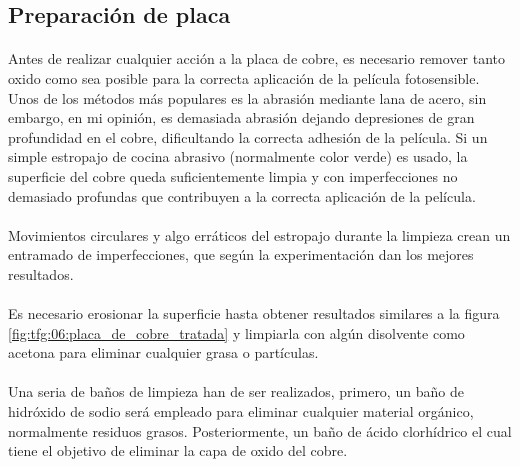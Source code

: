 \subsection{Preparación de placa}

\paragraph{} Antes de realizar cualquier acción a la placa de cobre, es necesario remover tanto oxido como sea posible para la correcta aplicación de la película fotosensible. Unos de los métodos más populares es la abrasión mediante lana de acero, sin embargo, en mi opinión, es demasiada abrasión dejando depresiones de gran profundidad en el cobre, dificultando la correcta adhesión de la película. Si un simple estropajo de cocina abrasivo (normalmente color verde) es usado, la superficie del cobre queda suficientemente limpia y con imperfecciones no demasiado profundas que contribuyen a la correcta aplicación de la película.

\paragraph{} Movimientos circulares y algo erráticos del estropajo durante la limpieza crean un entramado de imperfecciones, que según la experimentación dan los mejores resultados.

\paragraph{} Es necesario erosionar la superficie hasta obtener resultados similares a la figura \ref{fig:tfg:06:placa_de_cobre_tratada} y limpiarla con algún disolvente como acetona para eliminar cualquier grasa o partículas.

\paragraph{} Una seria de baños de limpieza han de ser realizados, primero, un baño de hidróxido de sodio será empleado para eliminar cualquier material orgánico, normalmente residuos grasos. Posteriormente, un baño de ácido clorhídrico el cual tiene el objetivo de eliminar la capa de oxido del cobre. 

